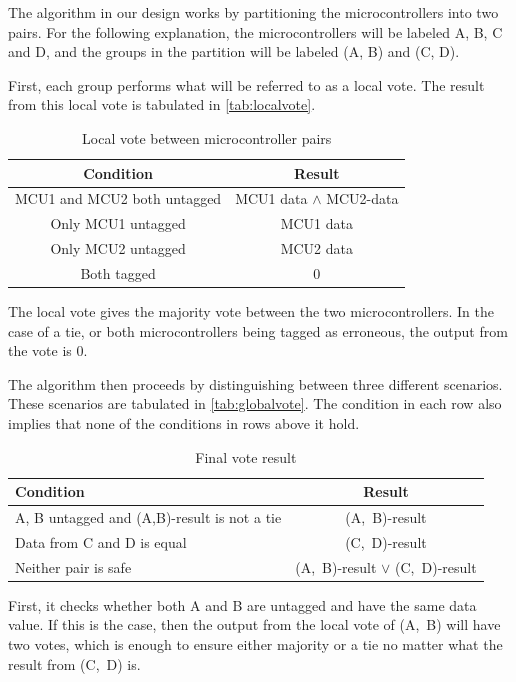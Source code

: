 The algorithm in our design works by partitioning the microcontrollers
into two pairs. For the following explanation, the microcontrollers
will be labeled A, B, C and D, and the groups in the partition will be
labeled (A, B) and (C, D).

First, each group performs what will be referred to as a local
vote. The result from this local vote is tabulated in
\autoref{tab:localvote}.

\begin{table}[htbp]
  \centering
  \caption{Local vote between microcontroller pairs}
  \begin{tabular}{|c|c|}
    \hline
    \textbf{Condition} & \textbf{Result} \\ \hline
    MCU1 and MCU2 both untagged & MCU1 data $\wedge$ MCU2-data \\ \hline
    Only MCU1 untagged & MCU1 data \\ \hline
    Only MCU2 untagged & MCU2 data \\ \hline
    Both tagged   & 0 \\ \hline
  \end{tabular}
  \label{tab:localvote}
\end{table}

The local vote gives the majority vote between the two
microcontrollers. In the case of a tie, or both microcontrollers being
tagged as erroneous, the output from the vote is 0. 

The algorithm then proceeds by distinguishing between three different
scenarios. These scenarios are tabulated in
\autoref{tab:globalvote}. The condition in each row also implies that
none of the conditions in rows above it hold.

\begin{table}[htbp]
  \centering
  \caption{Final vote result}
  \begin{tabular}{|p{7cm}|c|}
    \hline
    \textbf{Condition} & \textbf{Result} \\ \hline
    A, B untagged and (A,B)-result is not a tie & (A,~B)-result \\ \hline
    Data from C and D is equal & (C,~D)-result \\ \hline
    Neither pair is safe  & (A,~B)-result $\vee$ (C,~D)-result \\ \hline
  \end{tabular}
  \label{tab:globalvote}
\end{table}

First, it checks whether both A and B are untagged and have the same
data value. If this is the case, then the output from the local vote
of (A,~B) will have two votes, which is enough to ensure either
majority or a tie no matter what the result from (C,~D) is.

